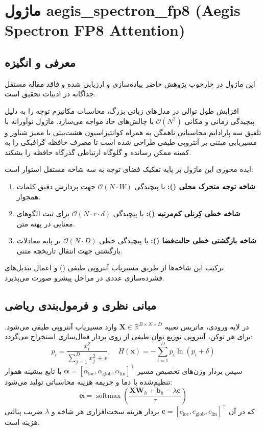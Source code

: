 \section{ماژول aegis\_spectron\_fp8 (Aegis Spectron FP8 Attention)}
\label{sec:module_aegis_spectron_fp8}

\subsection{معرفی و انگیزه}
این ماژول در چارچوب پژوهش حاضر پیاده‌سازی و ارزیابی شده و فاقد مقاله مستقل جداگانه در ادبیات تحقیق است.

افزایش طول توالی در مدل‌های زبانی بزرگ، محاسبات مکانیزم توجه را به دلیل پیچیدگی زمانی و مکانی $\mathcal{O}(N^2)$ با چالش‌های حاد مواجه می‌سازد. ماژول نوآورانه  با تلفیق سه پارادایم محاسباتی ناهمگن به همراه کوانتیزاسیون هشت‌بیتی با ممیز شناور  و مسیریابی مبتنی بر آنتروپی طیفی طراحی شده است تا مصرف حافظه گرافیکی را به کمینه ممکن رسانده و گلوگاه ارتباطی گذرگاه حافظه را بشکند.

ایده محوری این ماژول بر پایه تفکیک فضای توجه به سه شاخه مستقل استوار است:
\begin{enumerate}
    \item \textbf{شاخه توجه متحرک محلی ():} با پیچیدگی $\mathcal{O}(N \cdot W)$ جهت پردازش دقیق کلمات همجوار.
    \item \textbf{شاخه خطی کِرنلی کم‌مرتبه ():} با پیچیدگی $\mathcal{O}(N \cdot r \cdot d)$ برای ثبت الگوهای معنایی در پهنه متن.
    \item \textbf{شاخه بازگشتی خطی حالت‌فضا ():} با پیچیدگی خطی $\mathcal{O}(N \cdot D)$ بر پایه معادلات بازگشتی جهت انتقال تاریخچه متنی.
\end{enumerate}
ترکیب این شاخه‌ها از طریق مسیریاب آنتروپی طیفی () و اعمال تبدیل‌های فشرده‌سازی عددی  در مراحل پیشرو صورت می‌پذیرد.

\subsection{مبانی نظری و فرمول‌بندی ریاضی}
در لایه ورودی، ماتریس تعبیه $\mathbf{X} \in \mathbb{R}^{B \times N \times D}$ وارد مسیریاب آنتروپی طیفی می‌شود. برای هر توکن، آنتروپی توزیع توان طیفی از روی بردار فعال‌سازی استخراج می‌گردد:
\begin{equation}
p_i = \frac{x_i^2}{\sum_{j=1}^D x_j^2 + \epsilon}, \quad H(\mathbf{x}) = -\sum_{i=1}^D p_i \ln(p_i + \delta)
\end{equation}
سپس بردار وزن‌های تخصیص مسیر $\boldsymbol{\alpha} = [\alpha_{\text{loc}}, \alpha_{\text{glob}}, \alpha_{\text{lin}}]^\top$ با تابع بیشینه هموار تنظیم‌شده با دما و جریمه هزینه محاسباتی تولید می‌شود:
\begin{equation}
\boldsymbol{\alpha} = \operatorname{softmax}\left(\frac{\mathbf{X} \mathbf{W}_h + \mathbf{b}_h - \lambda \mathbf{c}}{\tau}\right)
\end{equation}
که در آن $\mathbf{c} = [c_{\text{loc}}, c_{\text{glob}}, c_{\text{lin}}]^\top$ بردار هزینه سخت‌افزاری هر شاخه و $\lambda$ ضریب پنالتی هزینه است.

